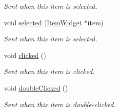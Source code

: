 \begin{DoxyCompactItemize}
\begin{DoxyCompactList}\small\item\em Sent when this item is selected. \end{DoxyCompactList}\item 
void \hyperlink{class_u_i_1_1_item_widget_ab1c47ab151ebd1b44762799703a32e97}{selected} (\hyperlink{class_u_i_1_1_item_widget}{Item\-Widget} $\ast$item)
\begin{DoxyCompactList}\small\item\em Sent when this item is selected. \end{DoxyCompactList}\item 
void \hyperlink{class_u_i_1_1_item_widget_a0d433f7236a4fa8f843cec6e74c16782}{clicked} ()
\begin{DoxyCompactList}\small\item\em Sent when this item is clicked. \end{DoxyCompactList}\item 
void \hyperlink{class_u_i_1_1_item_widget_adf7e9e58ecda9c965964e459672887a6}{double\-Clicked} ()
\begin{DoxyCompactList}\small\item\em Sent when this item is double-\/clicked. \end{DoxyCompactList}\end{DoxyCompactItemize}
